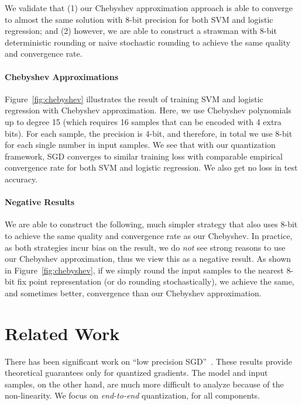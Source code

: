 \documentclass{article}
\begin{document}
We validate that (1) our Chebyshev 
approximation approach is able to
converge to almost the same solution 
with 8-bit precision for both SVM
and logistic regression;
and (2) however, we are able to construct
a strawman with 8-bit deterministic 
rounding or naive stochastic rounding
to achieve the same quality and convergence 
rate.

\vspace{-1em}
\paragraph{Chebyshev Approximations}

Figure~\ref{fig:chebyshev} illustrates
the result of training SVM
and logistic regression 
with Chebyshev approximation. Here,
we use Chebyshev polynomials up to
degree 15 (which requires 16 samples
that can be encoded with 4 extra 
bits). For each sample, the precision
is 4-bit, and therefore, in total
we use 8-bit for each single number
in input samples. We see that 
with our quantization framework,
SGD converges to similar training loss 
with comparable empirical convergence 
rate for both SVM and logistic regression.
We also get no loss in test accuracy.



\vspace{-1em}
\paragraph{Negative Results}

We are able to construct the following,
much simpler strategy that also
uses 8-bit to achieve the same quality
and convergence rate as our
Chebyshev. In practice, as both
strategies incur bias on the result,
we do {\em not} see strong reasons to
use our Chebyshev approximation, thus
we view this as a negative result.
As shown in Figure~\ref{fig:chebyshev},
if we simply round the input samples
to the nearest 8-bit fix point
representation (or do rounding
stochastically), we achieve the
same, and sometimes better,
convergence than our Chebyshev 
approximation.

\vspace{-1em}
\section{Related Work} 

\vspace{-0.5em}
There has been significant work on ``low precision SGD''~\cite{DeSa:NIPS:2015,Alistarh:2016:ArXiv}. 
These results provide
theoretical guarantees only for quantized gradients.
The model and input samples, on the other hand, are much more difficult
to analyze because of the non-linearity. We focus on {\em end-to-end}
quantization, for all  components.
\end{document}
